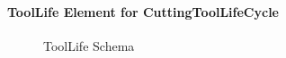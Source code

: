 \documentclass{mtconnect}	%
\begin{document}
\pagebreak

\paragraph{ToolLife Element for CuttingToolLifeCycle}\mbox{}

\begin{figure}[ht]
  \centering
  \caption{ToolLife Schema}
  \label{fig:toollife-schema}
\end{figure}

\FloatBarrier
\end{document}
